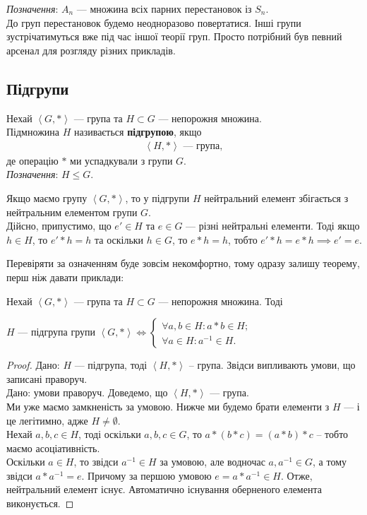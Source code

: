 \documentclass{math_library}
\begin{document}
\textit{Позначення}: $A_n$ --- множина всіх парних перестановок із $S_n$.
\bigskip \\
До груп перестановок будемо неодноразово повертатися. Інші групи зустрічатимуться вже під час іншої теорії груп. Просто потрібний був певний арсенал для розгляду різних прикладів.

\subsection{Підгрупи}
\begin{definition}
Нехай $\left<G,* \right>$ --- група та $H \subset G$ --- непорожня множина.\\
Підмножина $H$ називається \textbf{підгрупою}, якщо 
\begin{align*}
\left<H,* \right> \text{ --- група},
\end{align*}
де операцію $*$ ми успадкували з групи $G$.\\
\textit{Позначення}: $H \leq G$.
\end{definition}

\begin{remark}
Якщо маємо групу $\left<G,*\right>$, то у підгрупи $H$ нейтральний елемент збігається з нейтральним елементом групи $G$.
\bigskip \\
Дійсно, припустимо, що $e' \in H$ та $e \in G$ --- різні нейтральні елементи. Тоді якщо $h \in H$, то $e' * h = h$ та оскільки $h \in G$, то $e*h = h$, тобто $e'*h = e*h \implies e'=e$.
\end{remark}

Перевіряти за означенням буде зовсім некомфортно, тому одразу залишу теорему, перш ніж давати приклади:

\begin{theorem}
Нехай $\left<G,* \right>$ --- група та $H \subset G$ --- непорожня множина. Тоді
\begin{center}
$H$ --- підгрупа групи $\left<G,*\right> \iff \begin{cases} \forall a,b \in H: a*b \in H; \\ \forall a \in H: a^{-1} \in H. \end{cases}$
\end{center}
\end{theorem}

\begin{proof}
\rightproof Дано: $H$ --- підгрупа, тоді $\left<H,* \right>$ -- група. Звідси випливають умови, що записані праворуч.
\bigskip \\
\leftproof Дано: умови праворуч. Доведемо, що $\left<H,* \right>$ --- група.\\
Ми уже маємо замкненість за умовою. Нижче ми будемо брати елементи з $H$ --- і це легітимно, адже $H \neq \emptyset$.\\
Нехай $a,b,c \in H$, тоді оскільки $a,b,c \in G$, то $a*(b*c) = (a*b)*c$ -- тобто маємо асоціативність.\\
Оскільки $a \in H$, то звідси $a^{-1} \in H$ за умовою, але водночас $a,a^{-1} \in G$, а тому звідси $a*a^{-1} = e$. Причому за першою умовою $e = a*a^{-1} \in H$. Отже, нейтральний елемент існує. Автоматично існування оберненого елемента виконується.
\end{proof}
\end{document}
